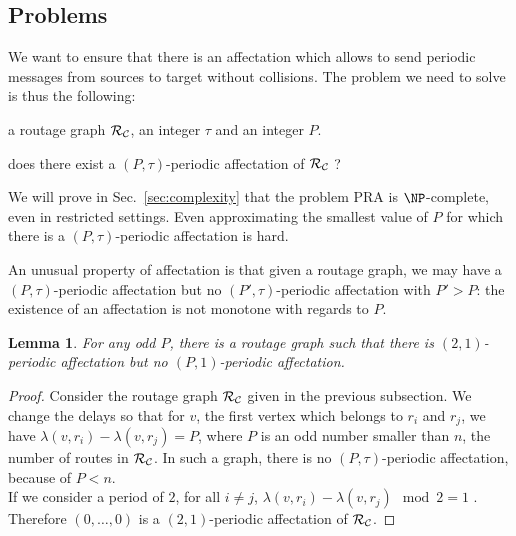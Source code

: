 \documentclass[a4paper,10pt]{article}
\newtheorem{lemma}[theorem]{Lemma}
\begin{document}
   \subsection{Problems}

    We want to ensure that there is an affectation which allows to send periodic messages from sources to target
    without collisions. The problem we need to solve is thus the following:
    


       a routage graph $\cal R_{\cal C}$, an integer $\tau$ and an integer $P$.

       does there exist a $(P,\tau)$-periodic affectation of $\cal R_{\cal C}$ ?


      We will prove in Sec.~\ref{sec:complexity} that the problem PRA is $\NP$-complete, even in restricted settings.
      Even approximating the smallest value of $P$ for which there is a $(P,\tau)$-periodic affectation is hard.

      An unusual property of affectation is that given a routage graph, we may have a $(P,\tau)$-periodic affectation but no
      $(P',\tau)$-periodic affectation with $P' > P$: the existence of an affectation is not monotone with regards to $P$.

	\begin{lemma} 
	 For any odd $P$, there is a routage graph such that there is $(2,1)$-periodic affectation but no $(P,1)$-periodic affectation.
	\end{lemma}
\begin{proof}

      Consider the routage graph ${\cal R_{\cal C}}$ given in the previous subsection. 
      We change the delays so that for $v$, the first vertex which belongs to $r_i$ and $r_j$,
      we have $\lambda(v,r_i) - \lambda(v,r_j)= P$, where $P$ is an odd number smaller than $n$, the number of routes in ${\cal R_{\cal C}}$. In such a graph, there is no $(P,\tau)$-periodic affectation, because of $P < n$.\\
      If we consider a period of $2$, for all $i \neq j$, $\lambda(v,r_i) - \lambda(v,r_j) \mod 2 = 1$ . Therefore $(0,\dots,0)$ is a $(2,1)$-periodic affectation of ${\cal R_{\cal C}}$.

      
\end{proof}
      
% 
\end{document}
